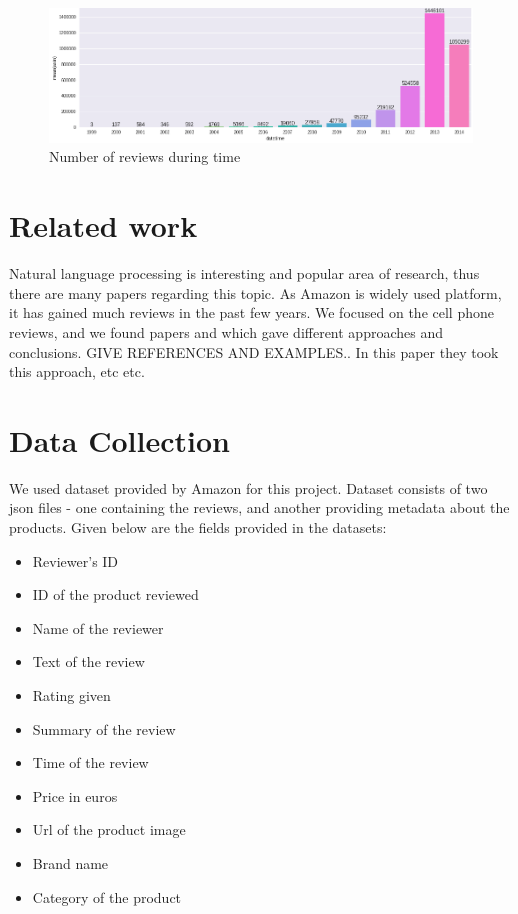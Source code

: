 \documentclass[11pt]{article}
\begin{document}
\begin{figure}[h!]
  \centering
    \includegraphics[width=\linewidth]{reviewsByTime.png}
  \caption{Number of reviews during time}
  \label{fig:reviewsByTime}
\end{figure}


\section{Related work}
Natural language processing is interesting and popular area of research, thus there are many papers regarding this topic. As Amazon is widely used platform, it has gained much reviews in the past few years. We focused on the cell phone reviews, and we found papers and which gave different approaches and conclusions. GIVE REFERENCES AND EXAMPLES.. In this paper they took this approach, etc etc.


\section{Data Collection}
We used dataset provided by Amazon for this project. Dataset consists of two json files - one containing the reviews, and another providing metadata about the products. Given below are the fields provided in the datasets:

\begin{itemize}
  \item Reviewer's ID
  \item ID of the product reviewed
  \item Name of the reviewer
  \item Text of the review
  \item Rating given
  \item Summary of the review
  \item Time of the review
  \item Price in euros
  \item Url of the product image
  \item Brand name
  \item Category of the product
\end{itemize}
\end{document}
